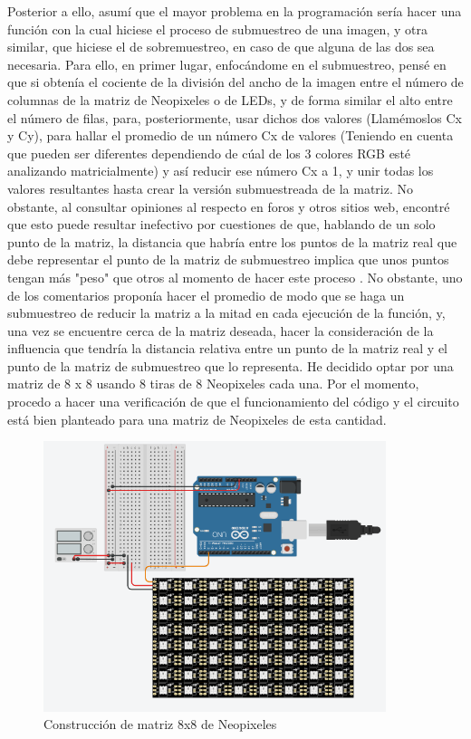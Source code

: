 \documentclass{article}
\begin{document}
 Posterior a ello, asumí que el mayor problema en la programación sería hacer una función con la cual hiciese el proceso de submuestreo de una imagen, y otra similar, que hiciese el de sobremuestreo, en caso de que alguna de las dos sea necesaria. Para ello, en primer lugar, enfocándome en el submuestreo, pensé en que si obtenía el cociente de la división del ancho de la imagen entre el número de columnas de la matriz de Neopixeles o de LEDs, y de forma similar el alto entre el número de filas, para, posteriormente, usar dichos dos valores (Llamémoslos Cx y Cy), para hallar el promedio de un número Cx de valores (Teniendo en cuenta que pueden ser diferentes dependiendo de cúal de los 3 colores RGB esté analizando matricialmente) y así reducir ese número Cx a 1, y unir todas los valores resultantes hasta crear la versión submuestreada de la matriz. No obstante, al consultar opiniones al respecto en foros y otros sitios web, encontré que esto puede resultar inefectivo por cuestiones de que, hablando de un solo punto de la matriz, la distancia que habría entre los puntos de la matriz real que debe representar el punto de la matriz de submuestreo implica que unos puntos tengan más "peso" que otros al momento de hacer este proceso \cite{AplicarRemuestreo}. No obstante, uno de los comentarios \cite{Comm_ReduImg} proponía hacer el promedio de modo que se haga un submuestreo de reducir la matriz a la mitad en cada ejecución de la función, y, una vez se encuentre cerca de la matriz deseada, hacer la consideración de la influencia que tendría la distancia relativa entre un punto de la matriz real y el punto de la matriz de submuestreo que lo representa. He decidido optar por una matriz de 8 x 8 usando 8 tiras de 8 Neopixeles cada una. Por el momento, procedo a hacer una verificación de que el funcionamiento del código y el circuito está bien planteado para una matriz de Neopixeles de esta cantidad.
 \begin{figure}[h]
    \includegraphics[width=10cm]{matriz8x8Neopixeles.png}
    \centering
    \caption{Construcción de matriz 8x8 de Neopixeles}
    \label{fig:matriz8x8Neopixeles}
 \end{figure}
\end{document}
